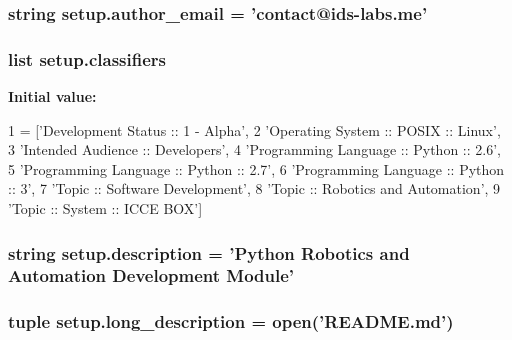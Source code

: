 \subsubsection[{author\+\_\+email}]{\setlength{\rightskip}{0pt plus 5cm}string setup.\+author\+\_\+email = 'contact@ids-\/labs.\+me'}\label{namespacesetup_a4ead8e1ca45242906fde7d5489f3beaa}
\hypertarget{namespacesetup_aa6d1b3ef82314b74854a1a1a473aadbf}{}
\subsubsection[{classifiers}]{\setlength{\rightskip}{0pt plus 5cm}list setup.\+classifiers}\label{namespacesetup_aa6d1b3ef82314b74854a1a1a473aadbf}
{\bfseries Initial value\+:}
\begin{DoxyCode}
1 = [\textcolor{stringliteral}{'Development Status :: 1 - Alpha'},
2                \textcolor{stringliteral}{'Operating System :: POSIX :: Linux'},
3                \textcolor{stringliteral}{'Intended Audience :: Developers'},
4                \textcolor{stringliteral}{'Programming Language :: Python :: 2.6'},
5                \textcolor{stringliteral}{'Programming Language :: Python :: 2.7'},
6                \textcolor{stringliteral}{'Programming Language :: Python :: 3'},
7                \textcolor{stringliteral}{'Topic :: Software Development'},
8                \textcolor{stringliteral}{'Topic :: Robotics and Automation'},
9                \textcolor{stringliteral}{'Topic :: System :: ICCE BOX'}]
\end{DoxyCode}
\hypertarget{namespacesetup_a4ad612547892c74be7035043265eb65c}{}
\subsubsection[{description}]{\setlength{\rightskip}{0pt plus 5cm}string setup.\+description = 'Python Robotics and Automation Development Module'}\label{namespacesetup_a4ad612547892c74be7035043265eb65c}
\hypertarget{namespacesetup_a2e8655c91c2658305ee0ee4c023d59eb}{}
\subsubsection[{long\+\_\+description}]{\setlength{\rightskip}{0pt plus 5cm}tuple setup.\+long\+\_\+description = open('R\+E\+A\+D\+M\+E.\+md')}\label{namespacesetup_a2e8655c91c2658305ee0ee4c023d59eb}
\hypertarget{namespacesetup_a61c4df0a151113447498726d453324de}{}
